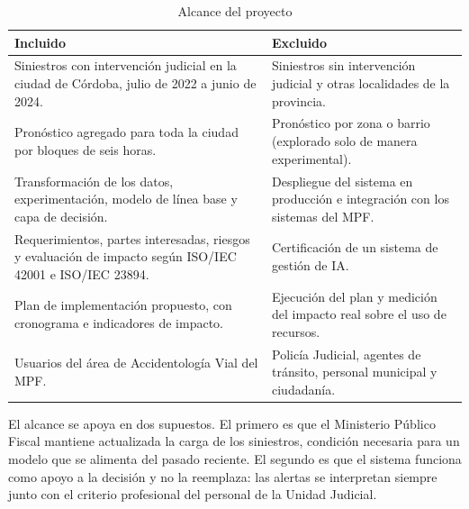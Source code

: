 \begin{table}[htbp]
\centering
\caption{Alcance del proyecto}
\label{tab:alcance}
\begin{tabularx}{\linewidth}{@{}>{\raggedright\arraybackslash}X>{\raggedright\arraybackslash}X@{}}
\toprule
\textbf{Incluido} & \textbf{Excluido} \\
\midrule
Siniestros con intervención judicial en la ciudad de Córdoba, julio de 2022 a junio de 2024. & Siniestros sin intervención judicial y otras localidades de la provincia. \\
Pronóstico agregado para toda la ciudad por bloques de seis horas. & Pronóstico por zona o barrio (explorado solo de manera experimental). \\
Transformación de los datos, experimentación, modelo de línea base y capa de decisión. & Despliegue del sistema en producción e integración con los sistemas del MPF. \\
Requerimientos, partes interesadas, riesgos y evaluación de impacto según ISO/IEC 42001 e ISO/IEC 23894. & Certificación de un sistema de gestión de IA. \\
Plan de implementación propuesto, con cronograma e indicadores de impacto. & Ejecución del plan y medición del impacto real sobre el uso de recursos. \\
Usuarios del área de Accidentología Vial del MPF. & Policía Judicial, agentes de tránsito, personal municipal y ciudadanía. \\
\bottomrule
\end{tabularx}
\end{table}

El alcance se apoya en dos supuestos. El primero es que el Ministerio Público Fiscal mantiene actualizada la carga de los siniestros, condición necesaria para un modelo que se alimenta del pasado reciente. El segundo es que el sistema funciona como apoyo a la decisión y no la reemplaza: las alertas se interpretan siempre junto con el criterio profesional del personal de la Unidad Judicial.
